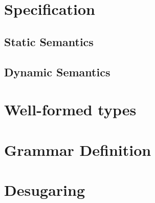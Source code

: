 \section{Specification}

%
\subsection{Static Semantics}\label{subsec:static_sem}
\ottdefnsTypes%

\subsection{Dynamic Semantics}\label{subsec:dyn_sem}
\ottdefnsOpXXSem%







\section{Well-formed types}
\ottdefnsWellXXFormed%

\section{Grammar Definition}
\ottgrammar%

\section{Desugaring \lang}

